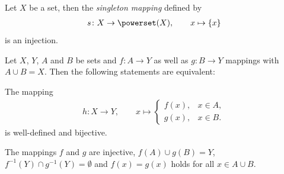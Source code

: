 \begin{examples}
\begin{exampleenumerate}
\begin{miniproof}
        \end{miniproof}
        \item\label{example:mappings:singleton_mapping} Let $X$ be a set, then the \emph{singleton mapping} defined by
        \begin{align}s\colon X\to\powerset(X),\qquad x\mapsto\{x\}\end{align}
        is an injection.
    \end{exampleenumerate}
\end{examples}

\begin{theorem}\label{theorem:mappings:bijective_union}
    Let $X$, $Y$, $A$ and $B$ be sets and $f\colon A\rightarrow Y$ as well as $g\colon B\rightarrow Y$ mappings with $A\cup B=X$. Then the following statements are equivalent:
    \begin{intheoremenumerate}
        \item The mapping
        \begin{align}h\colon X\rightarrow Y,\qquad x\mapsto \begin{cases}f(x),& x\in A,\\ g(x),& x\in B.\end{cases}\label{eq:mappings:bijective_union}\end{align}
        is well-defined and bijective.
        \item The mappings $f$ and $g$ are injective, $f(A)\cup g(B)=Y$, $f^{-1}(Y)\cap g^{-1}(Y)=\emptyset$ and $f(x)=g(x)$ holds for all $x\in A\cup B$.
    \end{intheoremenumerate}
\end{theorem}

